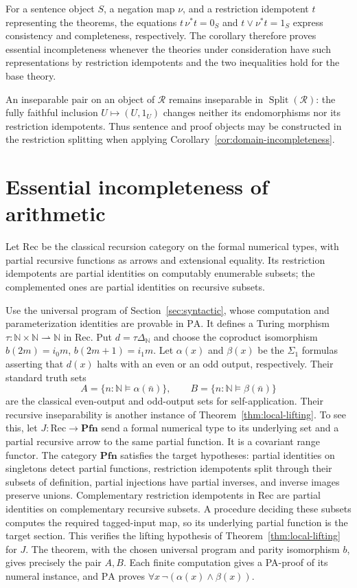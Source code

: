 \documentclass[11pt]{article}
\newcommand{\N}{\mathbb N}
\newcommand{\PA}{\mathrm{PA}}
\newcommand{\Pfn}{\mathbf{Pfn}}
\begin{document}
For a sentence object $S$, a negation map $\nu$, and a restriction
idempotent $t$ representing the theorems, the equations
$t\,\nu^*t=0_S$ and $t\vee\nu^*t=1_S$
express consistency and completeness, respectively.
The corollary therefore proves essential
incompleteness whenever the theories under consideration have such
representations by restriction idempotents and the two inequalities
hold for the base theory.

An inseparable pair on an object of $\mathscr R$ remains inseparable
in $\operatorname{Split}(\mathscr R)$: the fully faithful inclusion
$U\mapsto(U,1_U)$ changes neither its endomorphisms nor its restriction idempotents.
Thus sentence and proof objects may be constructed in the restriction
splitting when applying Corollary~\ref{cor:domain-incompleteness}.

\section{Essential incompleteness of arithmetic}\label{sec:arithmetic}

Let $\mathrm{Rec}$ be the classical recursion category on the formal
numerical types, with partial recursive functions as arrows and extensional
equality. Its restriction idempotents are partial identities on
computably enumerable subsets; the complemented ones are partial
identities on recursive subsets.

Use the universal program of Section~\ref{sec:syntactic}, whose
computation and parameterization identities are provable in $\PA$.
It defines a Turing morphism
$\tau:\N\times\N\rightharpoonup\N$ in $\mathrm{Rec}$.
Put $d=\tau\Delta_{\N}$ and choose the coproduct isomorphism
$b(2m)=i_0m$, $b(2m+1)=i_1m$.
Let $\alpha(x)$ and $\beta(x)$ be the $\Sigma_1$ formulas asserting
that $d(x)$ halts with an even or an odd output, respectively.
Their standard truth sets
\[
 A=\{n:\N\models\alpha(\bar n)\},\qquad
 B=\{n:\N\models\beta(\bar n)\}
\]
are the classical even-output and odd-output sets for self-application.
Their recursive inseparability is another instance of
Theorem~\ref{thm:local-lifting}. To see this, let
$J:\mathrm{Rec}\to\Pfn$ send a formal numerical type to its underlying
set and a partial recursive arrow to the same partial function.
It is a covariant range functor. The category $\Pfn$ satisfies
the target hypotheses: partial identities on singletons detect partial
functions, restriction idempotents split through their subsets of
definition, partial injections have partial inverses, and inverse images
preserve unions. Complementary restriction idempotents in $\mathrm{Rec}$
are partial identities on complementary recursive subsets. A procedure
deciding these subsets computes
the required tagged-input map, so its underlying partial function is
the target section. This verifies the lifting hypothesis of
Theorem~\ref{thm:local-lifting} for $J$.
The theorem, with the chosen universal program and parity
isomorphism $b$, gives precisely the pair $A,B$.
Each finite computation gives a PA-proof of its numeral instance, and $\PA$ proves
$\forall x\,\neg(\alpha(x)\land\beta(x))$.
\end{document}
